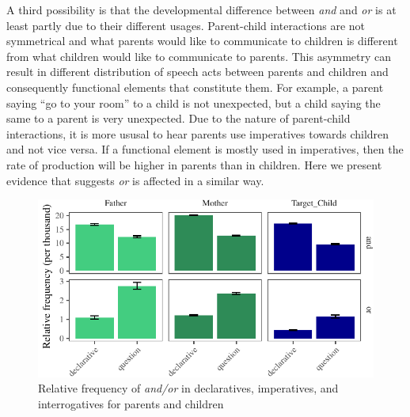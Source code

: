 \documentclass[,man,floatsintext]{apa6}
\begin{document}
A third possibility is that the developmental difference between \emph{and} and \emph{or} is at least partly due to their different usages. Parent-child interactions are not symmetrical and what parents would like to communicate to children is different from what children would like to communicate to parents. This asymmetry can result in different distribution of speech acts between parents and children and consequently functional elements that constitute them. For example, a parent saying \enquote{go to your room} to a child is not unexpected, but a child saying the same to a parent is very unexpected. Due to the nature of parent-child interactions, it is more ususal to hear parents use imperatives towards children and not vice versa. If a functional element is mostly used in imperatives, then the rate of production will be higher in parents than in children. Here we present evidence that suggests \emph{or} is affected in a similar way.

\begin{figure}[tb]

{\centering \includegraphics{figs/freqTablebySpeechAct-1} 

}

\caption{Relative frequency of \textit{and/or} in declaratives, imperatives, and interrogatives for parents and children }\label{fig:freqTablebySpeechAct}
\end{figure}
\end{document}
